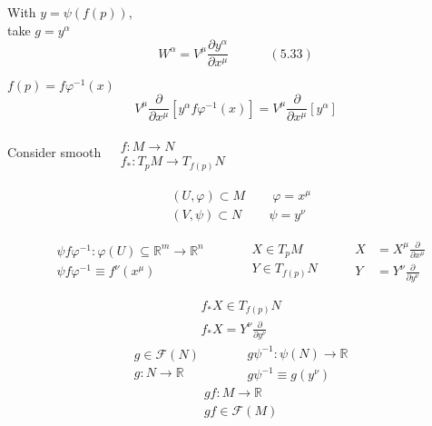 \documentclass{book}
\begin{document}
With $y = \psi(f(p))$, \\
take $g= y^{\alpha}$ 
\[
W^{\alpha} = V^{\mu} \frac{ \partial y^{\alpha} }{ \partial x^{\mu} } \quad \quad \quad \, (5.33)
\]

$f(p) = f\varphi^{-1}(x)$
\[
V^{\mu} \frac{ \partial }{ \partial x^{\mu} }[ y^{\alpha} f \varphi^{-1}(x) ] = V^{\mu} \frac{ \partial }{ \partial x^{\mu} }[y^{\alpha} ]
\]


Consider smooth $\begin{aligned} & \quad \\ 
  & f: M \to N \\
  & f_* : T_p M \to T_{f(p)}N \end{aligned}$  

\[
\begin{aligned}
  & (U , \varphi) \subset M \quad \quad \, \varphi = x^{\mu} \\ 
  & (V, \psi ) \subset N \quad \quad \, \psi = y^{\nu} \end{aligned}
\]

\[
\begin{aligned}
  & \psi f \varphi^{-1} : \varphi(U) \subseteq \mathbb{R}^m \to \mathbb{R}^n \\ 
  & \psi f\varphi^{-1} \equiv f^{\nu}(x^{\mu })
\end{aligned} \quad \quad \, \begin{aligned} 
  & X \in T_p M \\
  & Y \in T_{f(p)} N \end{aligned} \quad \quad \, \begin{aligned} 
  X & = X^{\mu} \frac{ \partial }{ \partial x^{\mu } } \\
  Y & = Y^{\nu} \frac{ \partial }{ \partial y^{\nu } } \end{aligned}
\]

\[
\begin{aligned}
  & f_* X \in T_{f(p)} N \\ 
  & f_* X   = Y^{\nu} \frac{ \partial }{ \partial y^{\nu }}
\end{aligned}
\]
\[
\begin{aligned}
  & g \in \mathcal{F}(N) \\ 
  & g: N \to \mathbb{R}
\end{aligned} \quad \quad \, 
\begin{aligned}
  & g\psi^{-1}: \psi(N) \to \mathbb{R} \\ 
  & g\psi^{-1} \equiv g(y^{\nu} )
\end{aligned} 
\]
\[
\begin{aligned}
  & gf : M \to \mathbb{R} \\ 
  & gf \in \mathcal{F}(M)
\end{aligned}
\]
\end{document}
